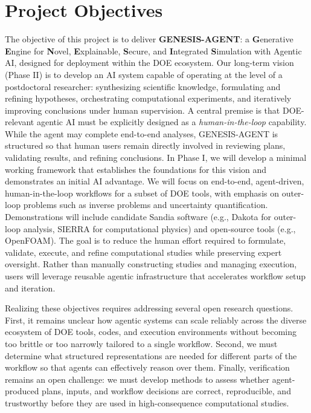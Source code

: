 \documentclass[11pt]{article} \usepackage[margin=1in]{geometry}
\begin{document}
\section{Project Objectives}
The objective of this project is to deliver \textbf{GENESIS-AGENT}: a
\textbf{G}enerative \textbf{E}ngine for \textbf{N}ovel, \textbf{E}xplainable,
\textbf{S}ecure, and \textbf{I}ntegrated \textbf{S}imulation with Agentic
AI, designed for deployment within the DOE ecosystem. Our long-term vision
(Phase II) is to develop an AI system capable of operating at the level of a
postdoctoral researcher: synthesizing scientific knowledge, formulating and
refining hypotheses, orchestrating computational experiments, and iteratively
improving conclusions under human supervision. A central premise is that
DOE-relevant agentic AI must be explicitly designed as a
\textit{human-in-the-loop} capability. While the agent may complete end-to-end
analyses, GENESIS-AGENT is structured so that human users remain directly
involved in reviewing plans, validating results, and refining
conclusions. %
In Phase I, we will develop a minimal working framework that establishes the
foundations for this vision and demonstrates an initial AI advantage. We will
focus on end-to-end, agent-driven, human-in-the-loop workflows for a subset of
DOE tools, with emphasis on outer-loop problems such as inverse problems and
uncertainty quantification. Demonstrations will include candidate Sandia
software (e.g., Dakota for outer-loop analysis, SIERRA for computational
physics) and open-source tools (e.g., OpenFOAM). The goal is to reduce the
human effort required to formulate, validate, execute, and refine computational
studies while preserving expert oversight. Rather than manually constructing
studies and managing execution, users will leverage reusable agentic
infrastructure that accelerates workflow setup and iteration.

Realizing these objectives requires addressing several open research questions.
First, it remains unclear how agentic systems can scale reliably across the
diverse ecosystem of DOE tools, codes, and execution environments without
becoming too brittle or too narrowly tailored to a single workflow. Second, we
must determine what structured representations are needed for different parts of
the workflow so that agents can effectively reason over them. Finally,
verification remains an open challenge: we must develop methods to assess
whether agent-produced plans, inputs, and workflow decisions are correct,
reproducible, and trustworthy before they are used in high-consequence
computational studies.
\end{document}

